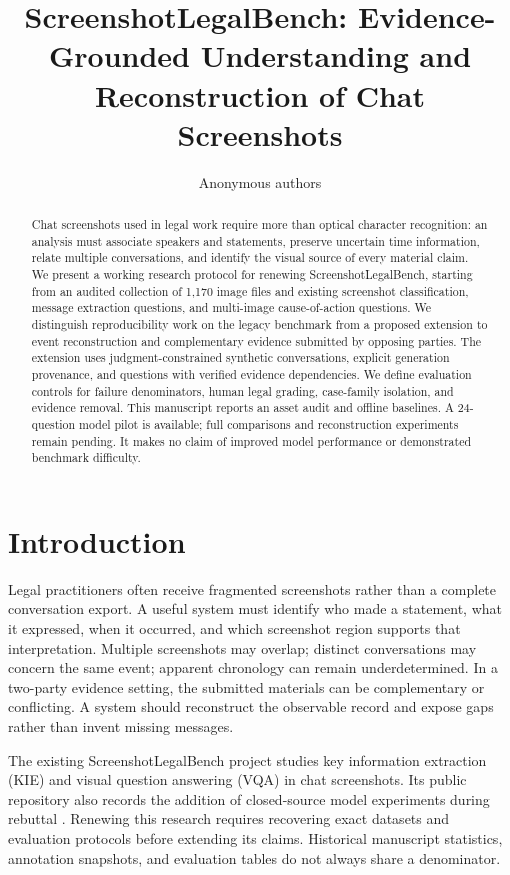 \documentclass[11pt]{article}
\title{ScreenshotLegalBench: Evidence-Grounded Understanding and Reconstruction of Chat Screenshots}
\author{Anonymous authors}
\date{}
\begin{document}
\maketitle
\begin{abstract}
Chat screenshots used in legal work require more than optical character recognition: an analysis must associate speakers and statements, preserve uncertain time information, relate multiple conversations, and identify the visual source of every material claim. We present a working research protocol for renewing ScreenshotLegalBench, starting from an audited collection of 1,170 image files and existing screenshot classification, message extraction questions, and multi-image cause-of-action questions. We distinguish reproducibility work on the legacy benchmark from a proposed extension to event reconstruction and complementary evidence submitted by opposing parties. The extension uses judgment-constrained synthetic conversations, explicit generation provenance, and questions with verified evidence dependencies. We define evaluation controls for failure denominators, human legal grading, case-family isolation, and evidence removal. This manuscript reports an asset audit and offline baselines. A 24-question model pilot is available; full comparisons and reconstruction experiments remain pending. It makes no claim of improved model performance or demonstrated benchmark difficulty.
\end{abstract}

\section{Introduction}
Legal practitioners often receive fragmented screenshots rather than a complete conversation export. A useful system must identify who made a statement, what it expressed, when it occurred, and which screenshot region supports that interpretation. Multiple screenshots may overlap; distinct conversations may concern the same event; apparent chronology can remain underdetermined. In a two-party evidence setting, the submitted materials can be complementary or conflicting. A system should reconstruct the observable record and expose gaps rather than invent missing messages.

The existing ScreenshotLegalBench project studies key information extraction (KIE) and visual question answering (VQA) in chat screenshots. Its public repository also records the addition of closed-source model experiments during rebuttal \citep{screenshotlegacy}. Renewing this research requires recovering exact datasets and evaluation protocols before extending its claims. Historical manuscript statistics, annotation snapshots, and evaluation tables do not always share a denominator.
\end{document}

